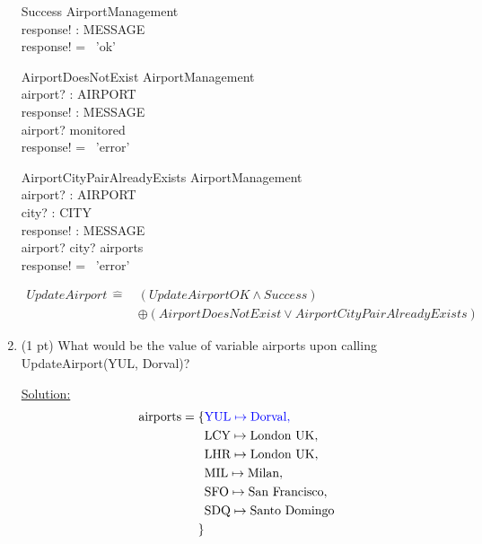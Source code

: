 \documentclass[12pt]{article}
\begin{document}
\begin{spacing}{1.5}
\begin{enumerate}
        \begin{schema}{Success}
            \Xi AirportManagement \\
            response! : MESSAGE \\
            \where
            response! = \, 'ok' \\
        \end{schema}

        \begin{schema}{AirportDoesNotExist}
            \Xi AirportManagement \\
            airport? : AIRPORT \\
            response! : MESSAGE \\
            \where
            airport? \notin monitored \\
            response! = \, 'error' \\
        \end{schema}

        \begin{schema}{AirportCityPairAlreadyExists}
            \Xi AirportManagement \\
            airport? : AIRPORT \\
            city? : CITY \\
            response! : MESSAGE \\
            \where
            airport? \mapsto city? \in airports \\
            response! = \, 'error' \\
        \end{schema}
        \begin{align*}
            UpdateAirport \, \hat{=} \, &(UpdateAirportOK \land Success) \\
            &\oplus (AirportDoesNotExist \lor AirportCityPairAlreadyExists)
        \end{align*}

        \item (1 pt) What would be the value of variable airports upon calling UpdateAirport(YUL, Dorval)?
        
        \underline{Solution:}        
        \begin{align*}
            \text{airports} = \{
            & \textcolor{blue}{\text{YUL} \mapsto \text{Dorval},} \\
            & \text{LCY} \mapsto \text{London UK}, \\
            & \text{LHR} \mapsto \text{London UK}, \\
            & \text{MIL} \mapsto \text{Milan}, \\
            & \text{SFO} \mapsto \text{San Francisco}, \\
            & \text{SDQ} \mapsto \text{Santo Domingo} \\
            \}
        \end{align*}


\end{enumerate}
\end{spacing}
\end{document}

